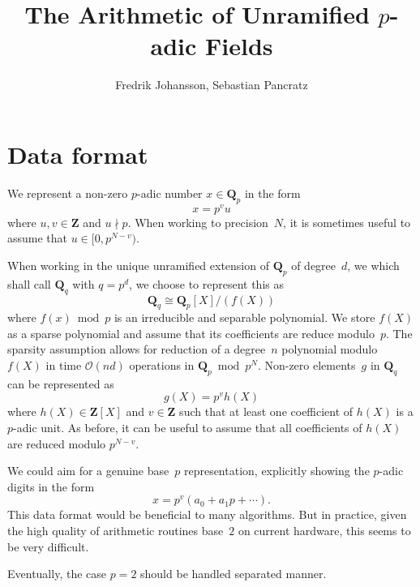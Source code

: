 \documentclass[a4paper,11pt]{article}
\author{Fredrik Johansson, Sebastian Pancratz}
\title{The Arithmetic of Unramified $p$-adic Fields}
\theoremstyle{definition}
\begin{document}

\section{Data format}

We represent a non-zero $p$-adic number $x \in \mathbf{Q}_p$ in the form 
\begin{equation}
x = p^v u
\end{equation}
where $u, v \in \mathbf{Z}$ and $u \nmid p$.  When working to precision~$N$, 
it is sometimes useful to assume that $u \in [0,p^{N-v})$.

When working in the unique unramified extension of $\mathbf{Q}_p$ of 
degree~$d$, we which shall call $\mathbf{Q}_q$ with $q = p^d$, we choose 
to represent this as 
\begin{equation}
\mathbf{Q}_q \cong \mathbf{Q}_p[X] / (f(X))
\end{equation}
where $f(x) \bmod p$ is an irreducible and separable polynomial.  We store 
$f(X)$ as a sparse polynomial and assume that its coefficients are 
reduce modulo~$p$.  The sparsity assumption allows for reduction of a 
degree~$n$ polynomial modulo~$f(X)$ in time $\mathcal{O}(nd)$ operations 
in $\mathbf{Q}_p \bmod p^N$.  Non-zero elements~$g$ in $\mathbf{Q}_q$ can 
be represented as 
\begin{equation}
g(X) = p^v h(X)
\end{equation}
where $h(X) \in \mathbf{Z}[X]$ and $v \in \mathbf{Z}$ such that at least 
one coefficient of $h(X)$ is a $p$-adic unit.  As before, it can be useful 
to assume that all coefficients of $h(X)$ are reduced modulo $p^{N-v}$.

We could aim for a genuine base~$p$ representation, explicitly showing 
the $p$-adic digits in the form 
\begin{equation}
x = p^v (a_0 + a_1 p + \dotsb).
\end{equation}
This data format would be beneficial to many algorithms.  But in practice, 
given the high quality of arithmetic routines base~$2$ on current hardware, 
this seems to be very difficult.

Eventually, the case $p = 2$ should be handled separated manner.
\end{document}
